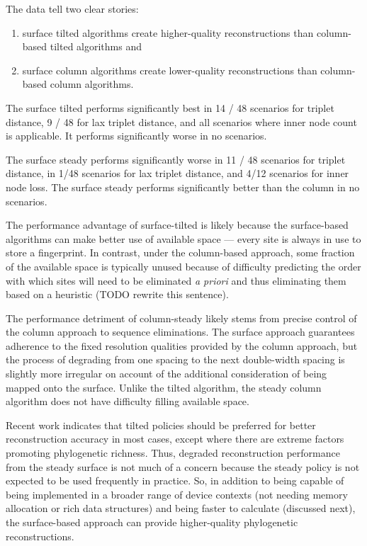 The data tell two clear stories:
\begin{enumerate}
\item surface tilted algorithms create higher-quality reconstructions than column-based tilted algorithms and
\item surface column algorithms create lower-quality reconstructions than column-based column algorithms.
\end{enumerate}

The surface tilted performs significantly best in 14 / 48 scenarios for triplet distance, 9 / 48 for lax triplet distance, and all scenarios where inner node count is applicable.
It performs significantly worse in no scenarios.

The surface steady performs significantly worse in 11 / 48 scenarios for triplet distance, in 1/48 scenarios for lax triplet distance, and 4/12 scenarios for inner node loss.
The surface steady performs significantly better than the column in no scenarios.

The performance advantage of surface-tilted is likely because the surface-based algorithms can make better use of available space --- every site is always in use to store a fingerprint.
In contrast, under the column-based approach, some fraction of the available space is typically unused because of difficulty predicting the order with which sites will need to be eliminated \textit{a priori} and thus eliminating them based on a heuristic (TODO rewrite this sentence).

The performance detriment of column-steady likely stems from precise control of the column approach to sequence eliminations.
The surface approach guarantees adherence to the fixed resolution qualities provided by the column approach, but the process of degrading from one spacing to the next double-width spacing is slightly more irregular on account of the additional consideration of being mapped onto the surface.
Unlike the tilted algorithm, the steady column algorithm does not have difficulty filling available space.

Recent work indicates that tilted policies should be preferred for better reconstruction accuracy in most cases, except where there are extreme factors promoting phylogenetic richness.
Thus, degraded reconstruction performance from the steady surface is not much of a concern because the steady policy is not expected to be used frequently in practice.
So, in addition to being capable of being implemented in a broader range of device contexts (not needing memory allocation or rich data structures) and being faster to calculate (discussed next), the surface-based approach can provide higher-quality phylogenetic reconstructions.

